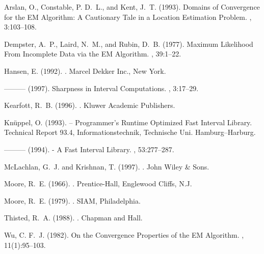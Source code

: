 \documentclass[10pt,twoside]{article}
\begin{document}
\begin{thebibliography}{}
\small

Arslan, O., Constable, P. D.~L., and Kent, J.~T. (1993).
\newblock Domains of {C}onvergence for the {EM} {A}lgorithm: A {C}autionary
  {T}ale in a {L}ocation {E}stimation {P}roblem.
, 3:103--108.
\par

Dempster, A.~P., Laird, N.~M., and Rubin, D.~B. (1977).
\newblock Maximum {L}ikelihood {F}rom {I}ncomplete {D}ata via the {EM}
  {A}lgorithm.
, 39:1--22.

Hansen, E. (1992).
.
\newblock Marcel Dekker Inc., New York.

--------- (1997).
\newblock Sharpness in {I}nterval {C}omputations.
, 3:17--29.

Kearfott, R.~B. (1996).
.
\newblock Kluwer Academic Publishers.

{Kn\"uppel}, O. (1993).
 -- {P}rogrammer's {R}untime {O}ptimized {F}ast {I}nterval
  {L}ibrary.
\newblock Technical Report 93.4, Informationstechnik, Technische Uni.
  Hamburg--Harburg.

--------- (1994).
 - {A} {F}ast {I}nterval {L}ibrary.
, 53:277--287.

McLachlan, G.~J. and Krishnan, T. (1997).
.
\newblock John Wiley \& Sons.

Moore, R.~E. (1966).
.
\newblock Prentice-Hall, Englewood Cliffs, N.J.

Moore, R.~E. (1979).
.
\newblock SIAM, Philadelphia.

Thisted, R.~A. (1988).
.
\newblock Chapman and Hall.

 Wu, C. F.~J. (1982).
\newblock On the {C}onvergence {P}roperties of the {EM} {A}lgorithm.
, 11(1):95--103.

\end{thebibliography}
\end{document}
